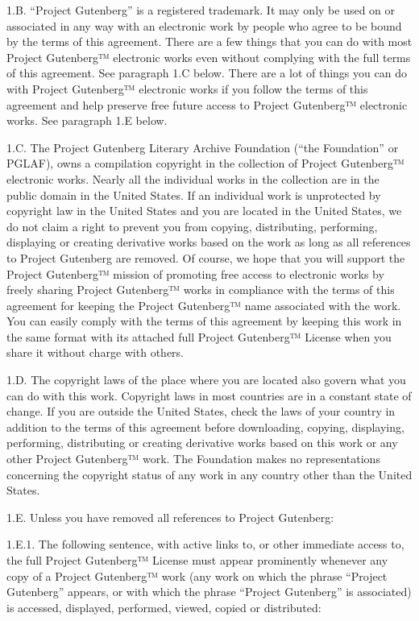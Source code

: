 1.B. ``Project Gutenberg'' is a registered trademark. It may only be
used on or associated in any way with an electronic work by people who
agree to be bound by the terms of this agreement. There are a few things
that you can do with most Project Gutenberg™ electronic works even
without complying with the full terms of this agreement. See paragraph
1.C below. There are a lot of things you can do with Project Gutenberg™
electronic works if you follow the terms of this agreement and help
preserve free future access to Project Gutenberg™ electronic works. See
paragraph 1.E below.

1.C. The Project Gutenberg Literary Archive Foundation (``the
Foundation'' or PGLAF), owns a compilation copyright in the collection
of Project Gutenberg™ electronic works. Nearly all the individual works
in the collection are in the public domain in the United States. If an
individual work is unprotected by copyright law in the United States and
you are located in the United States, we do not claim a right to prevent
you from copying, distributing, performing, displaying or creating
derivative works based on the work as long as all references to Project
Gutenberg are removed. Of course, we hope that you will support the
Project Gutenberg™ mission of promoting free access to electronic works
by freely sharing Project Gutenberg™ works in compliance with the terms
of this agreement for keeping the Project Gutenberg™ name associated
with the work. You can easily comply with the terms of this agreement by
keeping this work in the same format with its attached full Project
Gutenberg™ License when you share it without charge with others.

1.D. The copyright laws of the place where you are located also govern
what you can do with this work. Copyright laws in most countries are in
a constant state of change. If you are outside the United States, check
the laws of your country in addition to the terms of this agreement
before downloading, copying, displaying, performing, distributing or
creating derivative works based on this work or any other Project
Gutenberg™ work. The Foundation makes no representations concerning the
copyright status of any work in any country other than the United
States.

1.E. Unless you have removed all references to Project Gutenberg:

1.E.1. The following sentence, with active links to, or other immediate
access to, the full Project Gutenberg™ License must appear prominently
whenever any copy of a Project Gutenberg™ work (any work on which the
phrase ``Project Gutenberg'' appears, or with which the phrase ``Project
Gutenberg'' is associated) is accessed, displayed, performed, viewed,
copied or distributed:

